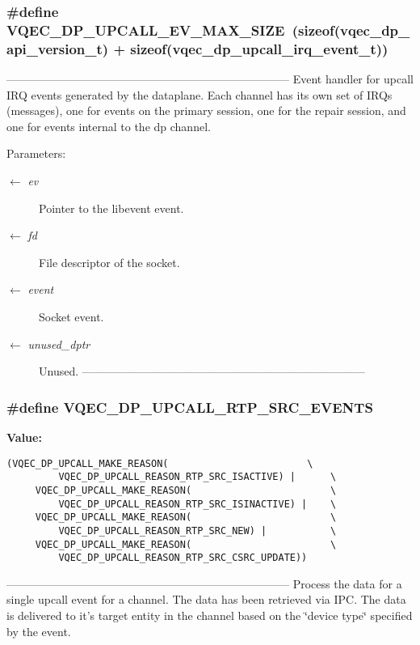 \subsubsection{\setlength{\rightskip}{0pt plus 5cm}\#define VQEC\_\-DP\_\-UPCALL\_\-EV\_\-MAX\_\-SIZE~(sizeof(vqec\_\-dp\_\-api\_\-version\_\-t) + sizeof(vqec\_\-dp\_\-upcall\_\-irq\_\-event\_\-t))}\label{vqec__upcall__event_8c_f51825943abc8664c0d90b4bd5bc03b8}


--------------------------------------------------------------------------- Event handler for upcall IRQ events generated by the dataplane. Each channel has its own set of IRQs (messages), one for events on the primary session, one for the repair session, and one for events internal to the dp channel.

\begin{Desc}
\item[Parameters:]
\begin{description}
\item[\mbox{$\leftarrow$} {\em ev}]Pointer to the libevent event. \item[\mbox{$\leftarrow$} {\em fd}]File descriptor of the socket. \item[\mbox{$\leftarrow$} {\em event}]Socket event. \item[\mbox{$\leftarrow$} {\em unused\_\-dptr}]Unused. --------------------------------------------------------------------------- \end{description}
\end{Desc}
\subsubsection{\setlength{\rightskip}{0pt plus 5cm}\#define VQEC\_\-DP\_\-UPCALL\_\-RTP\_\-SRC\_\-EVENTS}\label{vqec__upcall__event_8c_b07a1700c2b234fe001f4ce99d810cdd}


\textbf{Value:}

\begin{Code}\begin{verbatim}(VQEC_DP_UPCALL_MAKE_REASON(                        \
         VQEC_DP_UPCALL_REASON_RTP_SRC_ISACTIVE) |      \
     VQEC_DP_UPCALL_MAKE_REASON(                        \
         VQEC_DP_UPCALL_REASON_RTP_SRC_ISINACTIVE) |    \
     VQEC_DP_UPCALL_MAKE_REASON(                        \
         VQEC_DP_UPCALL_REASON_RTP_SRC_NEW) |           \
     VQEC_DP_UPCALL_MAKE_REASON(                        \
         VQEC_DP_UPCALL_REASON_RTP_SRC_CSRC_UPDATE))
\end{verbatim}\end{Code}
--------------------------------------------------------------------------- Process the data for a single upcall event for a channel. The data has been retrieved via IPC. The data is delivered to it's target entity in the channel based on the \char`\"{}device type\char`\"{} specified by the event.

